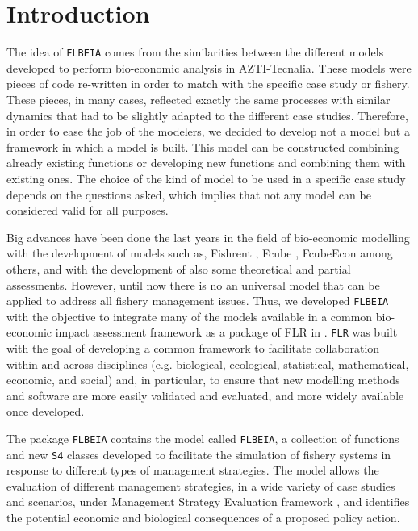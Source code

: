 
\section{Introduction}

The idea of \texttt{FLBEIA} comes from the similarities between the different models developed to perform bio-economic analysis in AZTI-Tecnalia. These models were pieces of code re-written in order to match with the specific case study or fishery. These pieces, in many cases, reflected exactly the same processes with similar dynamics that had to be slightly adapted to the different case studies. Therefore, in order to ease the job of the modelers, we decided to develop not a model but a framework in which a model is built. This model can be constructed combining already existing functions or developing new functions and combining them with existing ones. The choice of the kind of model to be used in a specific case study depends on the questions asked, which implies that not any model can be considered valid for all purposes.

Big advances have been done the last years in the field of bio-economic modelling with the development of models such as, Fishrent \citep{Salz2011}, Fcube \citep{Ulrich2011}, FcubeEcon \citep{Hoff2010} among others, and with the development of also some theoretical and partial assessments. However, until now there is no an universal model that can be applied to address all fishery management issues. Thus, we developed \texttt{FLBEIA} with the objective to integrate many of the models available in a common bio-economic impact assessment framework as a package of FLR \citep{Kell2007} in \citep{R2010}. \texttt{FLR} \citep{Kell2007} was built with the goal of developing a common framework to facilitate collaboration within and across disciplines (e.g. biological, ecological, statistical, mathematical, economic, and social) and, in particular, to ensure that new modelling methods and software are more easily validated and evaluated, and more widely available once developed.

The package \texttt{FLBEIA} contains the model called \texttt{FLBEIA}, a collection of functions and new \texttt{S4} classes developed to facilitate the simulation  of fishery systems in response to different types of management strategies. The model allows the evaluation of different management strategies, in a wide variety of case studies and scenarios, under Management Strategy Evaluation framework \citep{Butterworth1999, Butterworth2007, Delamare1998, Punt2007, Rademeyer2007}, and identifies the potential economic and biological consequences of a proposed policy action. 

